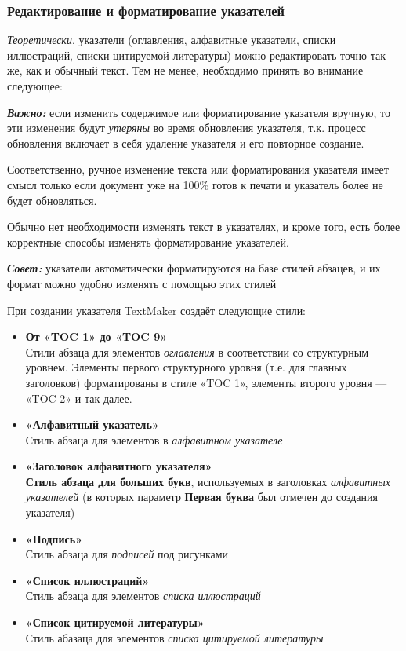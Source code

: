 ﻿\documentclass[a4paper,10pt]{article}
\begin{document}
\subsubsection{Редактирование и форматирование указателей}
\textit{Теоретически}, указатели (оглавления, алфавитные указатели, списки иллюстраций, списки цитируемой литературы) можно редактировать точно так же, как и обычный текст. Тем не менее, необходимо принять во внимание следующее:

\begin{mdframed}[backgroundcolor=blue!10]
\textbf{\textit{Важно:}} если изменить содержимое или форматирование указателя вручную, то эти изменения будут \textit{утеряны} во время обновления указателя, т.к. процесс обновления включает в себя удаление указателя и его повторное создание.
\end{mdframed}

Соответственно, ручное изменение текста или форматирования указателя имеет смысл только если документ уже на 100\% готов к печати и указатель более не будет обновляться.

Обычно нет необходимости изменять текст в указателях, и кроме того, есть более корректные способы изменять форматирование указателей.

\begin{mdframed}[backgroundcolor=blue!10]
\textbf{\textit{Совет:}} указатели автоматически форматируются на базе стилей абзацев, и их формат можно удобно изменять с помощью этих стилей
\end{mdframed}

При создании указателя TextMaker создаёт следующие стили:

\begin{itemize}
 \item \textbf{От «TOC 1» до «TOC 9»}\\
 Стили абзаца для элементов \textit{оглавления} в соответствии со структурным уровнем. Элементы первого структурного уровня (т.е. для главных заголовков) форматированы в стиле «TOC 1», элементы второго уровня — «TOC 2» и так далее.
 \item \textbf{«Алфавитный указатель»}\\
 Стиль абзаца для элементов в \textit{алфавитном указателе}
 \item \textbf{«Заголовок алфавитного указателя»\\
 Стиль абзаца для больших букв}, используемых в заголовках \textit{алфавитных указателей} (в которых параметр \textbf{Первая буква} был отмечен до создания указателя)
 \item \textbf{«Подпись»}\\
Стиль абзаца для \textit{подписей} под рисунками
\item \textbf{«Список иллюстраций»}\\
Стиль абзаца для элементов \textit{списка иллюстраций}
\item \textbf{«Список цитируемой литературы»}\\
Стиль абазаца для элементов \textit{списка цитируемой литературы}
\end{itemize}
\end{document}
